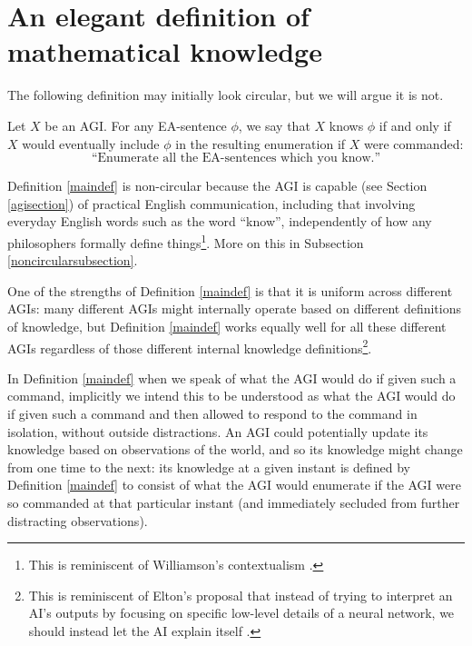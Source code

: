 \documentclass[runningheads]{llncs}
\begin{document}
\section{An elegant definition of mathematical knowledge}
\label{mainsection}

The following definition may initially look circular, but we will argue
it is not.

\begin{definition}
\label{maindef}
  Let $X$ be an AGI.
  For any EA-sentence $\phi$, we say that $X$
  knows $\phi$ if and only
  if $X$ would eventually include $\phi$ in the resulting enumeration
  if $X$ were commanded:
  \[
  \text{``Enumerate all the EA-sentences which you know.''}
  \]
\end{definition}

Definition \ref{maindef} is non-circular because
the AGI is capable (see Section \ref{agisection}) of practical English
communication, including that involving everyday English words such as
the word ``know'', independently of how any philosophers formally
define things\footnote{This is reminiscent of
Williamson's contextualism \cite{williamson2005knowledge}.}.
More on this in Subsection \ref{noncircularsubsection}.


One of the strengths of Definition \ref{maindef} is that it is uniform across
different AGIs: many different AGIs might internally operate based on different
definitions of knowledge, but Definition \ref{maindef} works equally well for
all these different AGIs regardless of those different internal knowledge
definitions\footnote{This is reminiscent of Elton's proposal that instead of
trying to interpret an AI's outputs by focusing on specific low-level details
of a neural network, we should instead let the AI explain itself \cite{elton}.}.

\begin{remark}
In Definition \ref{maindef} when we speak of what the AGI would do
if given such a command, implicitly we intend this to be understood as what
the AGI would do if given such a command and then allowed to respond to the
command in isolation, without outside distractions. An AGI could potentially
update its knowledge based on observations of the world, and so its knowledge
might change from one time to the next: its knowledge at a given instant is defined
by Definition \ref{maindef} to consist of what the AGI would enumerate if the
AGI were so commanded at that particular instant (and immediately secluded from
further distracting observations).
\end{remark}
\end{document}
